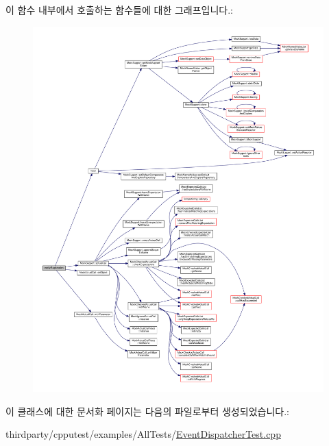 이 함수 내부에서 호출하는 함수들에 대한 그래프입니다.\+:
\nopagebreak
\begin{figure}[H]
\begin{center}
\leavevmode
\includegraphics[width=350pt]{class_observer_mock_a6cd12882f9fdde89f50fff140312c624_cgraph}
\end{center}
\end{figure}




이 클래스에 대한 문서화 페이지는 다음의 파일로부터 생성되었습니다.\+:\begin{DoxyCompactItemize}
\item 
thirdparty/cpputest/examples/\+All\+Tests/\hyperlink{_event_dispatcher_test_8cpp}{Event\+Dispatcher\+Test.\+cpp}\end{DoxyCompactItemize}
